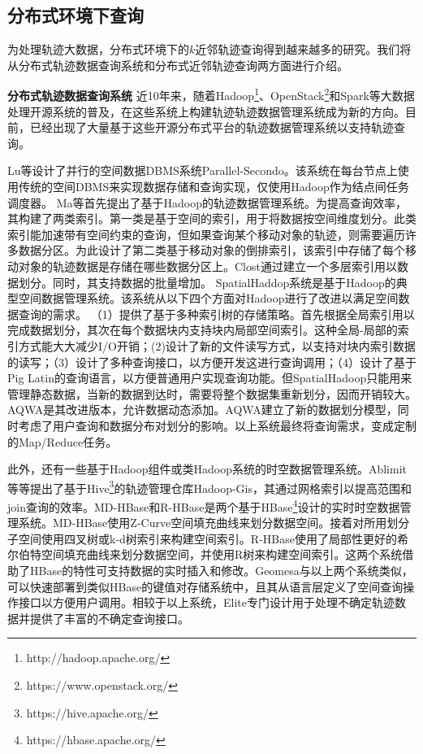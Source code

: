 \subsection{分布式环境下查询}
为处理轨迹大数据，分布式环境下的$k$近邻轨迹查询得到越来越多的研究。我们将从分布式轨迹数据查询系统和分布式近邻轨迹查询两方面进行介绍。

\textbf{分布式轨迹数据查询系统}
近10年来，随着Hadoop\footnote{http://hadoop.apache.org/}、OpenStack\footnote{https://www.openstack.org/}和Spark等大数据处理开源系统的普及，在这些系统上构建轨迹轨迹数据管理系统成为新的方向。目前，已经出现了大量基于这些开源分布式平台的轨迹数据管理系统以支持轨迹查询。

Lu等\cite{LuG12}设计了并行的空间数据DBMS系统Parallel-Secondo。该系统在每台节点上使用传统的空间DBMS来实现数据存储和查询实现，仅使用Hadoop作为结点间任务调度器。
Ma等\cite{MaYQZ09,YangMQZ09}首先提出了基于Hadoop的轨迹数据管理系统。为提高查询效率，其构建了两类索引。第一类是基于空间的索引，用于将数据按空间维度划分。此类索引能加速带有空间约束的查询，但如果查询某个移动对象的轨迹，则需要遍历许多数据分区。为此设计了第二类基于移动对象的倒排索引，该索引中存储了每个移动对象的轨迹数据是存储在哪些数据分区上。Clost\cite{TanLN12}通过建立一个多层索引用以数据划分。同时，其支持数据的批量增加。
SpatialHaddop\cite{SpatialHadoop}系统是基于Hadoop的典型空间数据管理系统。该系统从以下四个方面对Hadoop进行了改进以满足空间数据查询的需求。
（1）提供了基于多种索引树的存储策略。首先根据全局索引用以完成数据划分，其次在每个数据块内支持块内局部空间索引。这种全局-局部的索引方式能大大减少I/O开销；(2)设计了新的文件读写方式，以支持对块内索引数据的读写；（3）设计了多种查询接口，以方便开发这进行查询调用；（4）设计了基于Pig Latin的查询语言，以方便普通用户实现查询功能。但SpatialHadoop只能用来管理静态数据，当新的数据到达时，需要将整个数据集重新划分，因而开销较大。
AQWA\cite{AlyMHAOEQ15}是其改进版本，允许数据动态添加。AQWA建立了新的数据划分模型，同时考虑了用户查询和数据分布对划分的影响。以上系统最终将查询需求，变成定制的Map/Reduce\cite{DeanG04,mapreduce}任务。


此外，还有一些基于Hadoop组件或类Hadoop系统的时空数据管理系统。Ablimit等\cite{AjiWVLL0S13}等提出了基于Hive\footnote{https://hive.apache.org/}的轨迹管理仓库Hadoop-Gis，其通过网格索引以提高范围和join查询的效率。MD-HBase\cite{MDHBase}和R-HBase\cite{RHBase}是两个基于HBase\footnote{https://hbase.apache.org/}设计的实时时空数据管理系统。MD-HBase使用Z-Curve空间填充曲线来划分数据空间。接着对所用划分子空间使用四叉树或k-d树索引来构建空间索引。R-HBase使用了局部性更好的希尔伯特空间填充曲线来划分数据空间，并使用R树来构建空间索引。这两个系统借助了HBase的特性可支持数据的实时插入和修改。Geomesa\cite{Geomesa}与以上两个系统类似，可以快速部署到类似HBase的键值对存储系统中，且其从语言层定义了空间查询操作接口以方便用户调用。相较于以上系统，Elite\cite{XieMCDJ16}专门设计用于处理不确定轨迹数据并提供了丰富的不确定查询接口。


